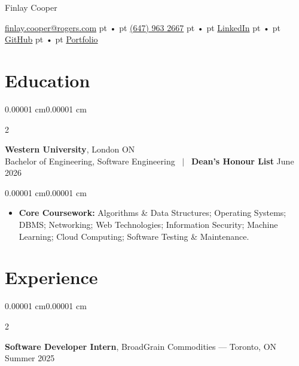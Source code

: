 \documentclass[10pt, letterpaper]{article}
\newenvironment{highlights}{
    \begin{itemize}[
        topsep=0.08 cm,
        parsep=0.06 cm,
        partopsep=0pt,
        itemsep=0pt,
        leftmargin=10pt
    ]
}{
    \end{itemize}
}
\newenvironment{onecolentry}{
    \begin{adjustwidth}{0.00001 cm}{0.00001 cm}
}{
    \end{adjustwidth}
}
\newenvironment{twocolentry}[2][3.6cm]{%
    \onecolentry
    \def\secondColumn{#2}%
    \setcolumnwidth{\fill, #1}%
    \begin{paracol}{2}%
}{%
    \switchcolumn \raggedleft \secondColumn
    \end{paracol}
    \endonecolentry
}
\newenvironment{header}{
    \setlength{\topsep}{0pt}\par\kern\topsep\centering\linespread{1.3}
}{
    \par\kern\topsep
}
\begin{document}
    \newcommand{\AND}{\unskip
        \cleaders\copy\ANDbox\hskip\wd\ANDbox
        \ignorespaces}
    \newsavebox\ANDbox
    \sbox\ANDbox{\textbar}

    \begin{header}
        \fontsize{20 pt}{20 pt}\selectfont Finlay Cooper

        \vspace{3 pt}

        \normalsize
        \centering
        \href{mailto:finlay.cooper@rogers.com}{finlay.cooper@rogers.com}  pt •  pt
        \href{tel:+1-647-963-2667}{(647) 963 2667}  pt •  pt
        \href{https://www.linkedin.com/in/finlaycooper/}{LinkedIn}  pt •  pt
        \href{https://github.com/FinlayCooper}{GitHub}  pt •  pt
        \href{https://finlaycooper.ca}{Portfolio}
    \end{header}

    \section{Education}

    \begin{twocolentry}{
        June 2026
    }
        \textbf{Western University}, London ON\\
        Bachelor of Engineering, Software Engineering ~$|$~ \textbf{Dean's Honour List}
    \end{twocolentry}
    \begin{onecolentry}
        \begin{highlights}
            \item \textbf{Core Coursework:} Algorithms \& Data Structures; Operating Systems; DBMS; Networking; Web Technologies; Information Security; Machine Learning; Cloud Computing; Software Testing \& Maintenance.
        \end{highlights}
    \end{onecolentry}

    \section{Experience}

\begin{twocolentry}{
    Summer 2025
}
    \textbf{Software Developer Intern}, BroadGrain Commodities --- Toronto, ON
\end{twocolentry}
\end{document}
